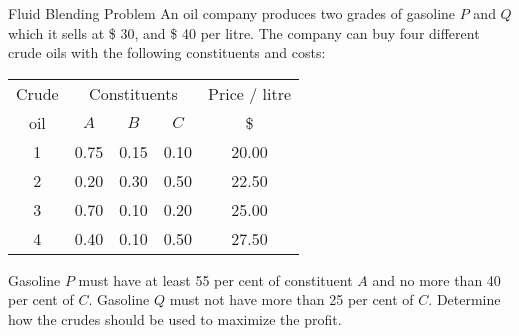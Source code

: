 \begin{frameExample}{Fluid Blending Problem}{}
  An oil company produces two grades of gasoline $P$ and $Q$ which it sells at \$ 30, and \$ 40 per litre. The company can buy four different crude oils with the following constituents and costs:

  {\centering
    \begin{tabular}{ccccc}
      \toprule
      Crude&\multicolumn{3}{c}{Constituents}& Price / litre\\
      \cmidrule{2-4}
      oil&$A$&$B$&$C$& \$ \\
      \midrule
      1&0.75&0.15&0.10 & 20.00\\
      2&0.20&0.30&0.50&22.50\\
      3&0.70&0.10&0.20&25.00\\
      4&0.40&0.10&0.50&27.50\\
      \bottomrule
    \end{tabular}
    \par}

  Gasoline $P$ must have at least 55 per cent of constituent $A$ and no more than 40 per cent of $C$. Gasoline $Q$ must not have more than 25 per cent of $C$. Determine how the crudes should be used to maximize the profit.
\end{frameExample}


